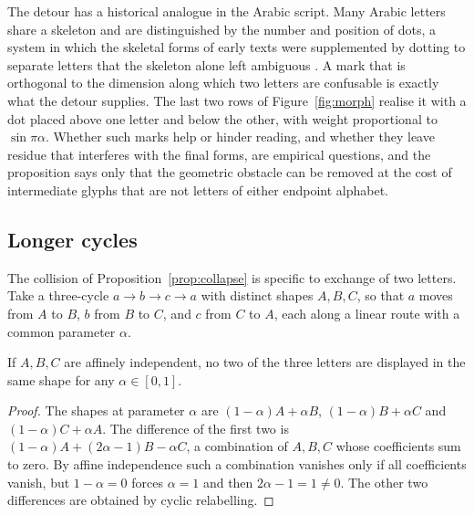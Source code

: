 The detour has a historical analogue in the Arabic script. Many Arabic letters share a skeleton and are distinguished by the number and position of dots, a system in which the skeletal forms of early texts were supplemented by dotting to separate letters that the skeleton alone left ambiguous \citep{daniels1996}. A mark that is orthogonal to the dimension along which two letters are confusable is exactly what the detour supplies. The last two rows of Figure~\ref{fig:morph} realise it with a dot placed above one letter and below the other, with weight proportional to $\sin\pi\alpha$. Whether such marks help or hinder reading, and whether they leave residue that interferes with the final forms, are empirical questions, and the proposition says only that the geometric obstacle can be removed at the cost of intermediate glyphs that are not letters of either endpoint alphabet.

\subsection{Longer cycles}

The collision of Proposition~\ref{prop:collapse} is specific to exchange of two letters. Take a three-cycle $a\to b\to c\to a$ with distinct shapes $A,B,C$, so that $a$ moves from $A$ to $B$, $b$ from $B$ to $C$, and $c$ from $C$ to $A$, each along a linear route with a common parameter $\alpha$.

\begin{proposition}\label{prop:cycles}
If $A,B,C$ are affinely independent, no two of the three letters are displayed in the same shape for any $\alpha\in[0,1]$.
\end{proposition}

\begin{proof}
The shapes at parameter $\alpha$ are $(1-\alpha)A+\alpha B$, $(1-\alpha)B+\alpha C$ and $(1-\alpha)C+\alpha A$. The difference of the first two is $(1-\alpha)A+(2\alpha-1)B-\alpha C$, a combination of $A,B,C$ whose coefficients sum to zero. By affine independence such a combination vanishes only if all coefficients vanish, but $1-\alpha=0$ forces $\alpha=1$ and then $2\alpha-1=1\ne0$. The other two differences are obtained by cyclic relabelling.
\end{proof}

